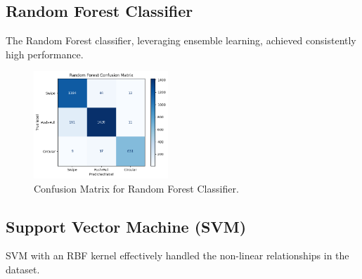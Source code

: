 \documentclass[10pt,twocolumn,letterpaper]{article}
\begin{document}
\subsection{Random Forest Classifier}

The Random Forest classifier, leveraging ensemble learning, achieved consistently high performance.

\begin{table}[h]
\small
\begin{center}
\caption{Performance Metrics for Random Forest Classifier}
\vspace{0.1cm}
\end{center}
\end{table}

\begin{figure}[h]
  \centering
  \includegraphics[width=0.45\textwidth]{figures/confusion_matrix_rf.png}
  \caption{Confusion Matrix for Random Forest Classifier.}
  \label{fig:confusion_matrix_rf}
\end{figure}

\subsection{Support Vector Machine (SVM)}

SVM with an RBF kernel effectively handled the non-linear relationships in the dataset.
\end{document}
